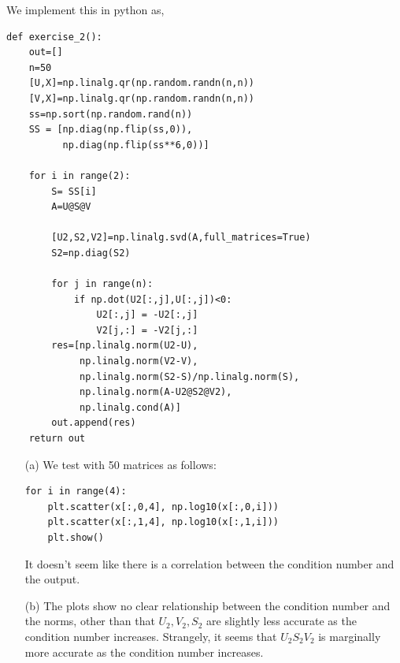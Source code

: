 \documentclass[10pt]{article}
\begin{document}
\begin{solution}[Solution]
We implement this in python as,
\begin{lstlisting}
def exercise_2():
    out=[]
    n=50
    [U,X]=np.linalg.qr(np.random.randn(n,n))
    [V,X]=np.linalg.qr(np.random.randn(n,n))
    ss=np.sort(np.random.rand(n))
    SS = [np.diag(np.flip(ss,0)), 
          np.diag(np.flip(ss**6,0))]
    
    for i in range(2):
        S= SS[i]
        A=U@S@V
        
        [U2,S2,V2]=np.linalg.svd(A,full_matrices=True)
        S2=np.diag(S2)
        
        for j in range(n):
            if np.dot(U2[:,j],U[:,j])<0:
                U2[:,j] = -U2[:,j]
                V2[j,:] = -V2[j,:]
        res=[np.linalg.norm(U2-U),
             np.linalg.norm(V2-V),
             np.linalg.norm(S2-S)/np.linalg.norm(S),
             np.linalg.norm(A-U2@S2@V2),
             np.linalg.cond(A)]
        out.append(res)
    return out 
\end{lstlisting}
\begin{enumerate}
    \item[(a)] 
        We test with 50 matrices as follows:
        \begin{lstlisting}
for i in range(4):
    plt.scatter(x[:,0,4], np.log10(x[:,0,i]))
    plt.scatter(x[:,1,4], np.log10(x[:,1,i]))
    plt.show()
        \end{lstlisting}
    It doesn't seem like there is a correlation between the condition number and the output.
    \item[(b)] 
        The plots show no clear relationship between the condition number and the norms, other than that \( U_2, V_2, S_2 \) are slightly less accurate as the condition number increases. Strangely, it seems that \( U_2S_2V_2 \) is marginally more accurate as the condition number increases.


\end{enumerate}
\end{solution}
\end{document}
